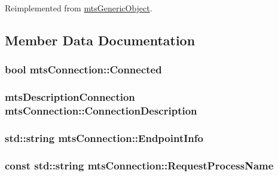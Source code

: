 Reimplemented from \hyperlink{classmts_generic_object_a2030aaa58bc215eccce1dc8d20dd0fdc}{mts\+Generic\+Object}.



\subsection{Member Data Documentation}
\hypertarget{classmts_connection_a2384cf6081cf01b9330bf6810108c2b5}{}
\subsubsection[{Connected}]{\setlength{\rightskip}{0pt plus 5cm}bool mts\+Connection\+::\+Connected\hspace{0.3cm}{\ttfamily [protected]}}\label{classmts_connection_a2384cf6081cf01b9330bf6810108c2b5}
\hypertarget{classmts_connection_a0a529fcb9c6627e79c49eb05265dd43e}{}
\subsubsection[{Connection\+Description}]{\setlength{\rightskip}{0pt plus 5cm}mts\+Description\+Connection mts\+Connection\+::\+Connection\+Description\hspace{0.3cm}{\ttfamily [protected]}}\label{classmts_connection_a0a529fcb9c6627e79c49eb05265dd43e}
\hypertarget{classmts_connection_ad5e701a7d4fe0a27b084d0f8d161c7d6}{}
\subsubsection[{Endpoint\+Info}]{\setlength{\rightskip}{0pt plus 5cm}std\+::string mts\+Connection\+::\+Endpoint\+Info\hspace{0.3cm}{\ttfamily [protected]}}\label{classmts_connection_ad5e701a7d4fe0a27b084d0f8d161c7d6}
\hypertarget{classmts_connection_a81c4b5147db8f46d70b30c7fabbc72c8}{}
\subsubsection[{Request\+Process\+Name}]{\setlength{\rightskip}{0pt plus 5cm}const std\+::string mts\+Connection\+::\+Request\+Process\+Name\hspace{0.3cm}{\ttfamily [protected]}}\label{classmts_connection_a81c4b5147db8f46d70b30c7fabbc72c8}
\hypertarget{classmts_connection_a6c190911c627762bcdc0a2145a6739c8}{}
